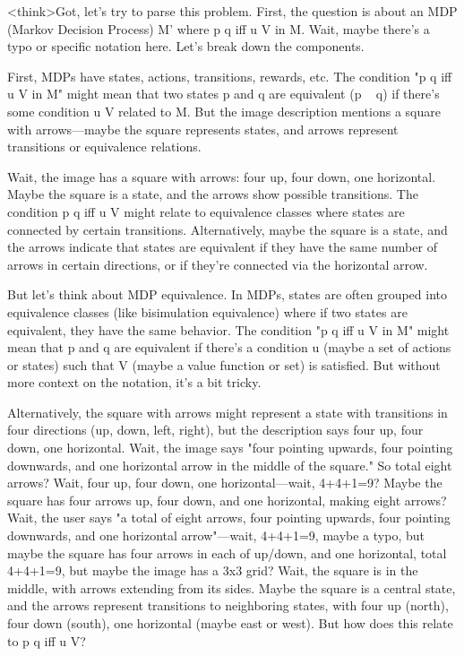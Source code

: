 <think>Got, let's try to parse this problem. First, the question is about an MDP (Markov Decision Process) M' where p q iff u V in M. Wait, maybe there's a typo or specific notation here. Let's break down the components.

First, MDPs have states, actions, transitions, rewards, etc. The condition "p q iff u V in M" might mean that two states p and q are equivalent (p ~ q) if there's some condition u V related to M. But the image description mentions a square with arrows—maybe the square represents states, and arrows represent transitions or equivalence relations.

Wait, the image has a square with arrows: four up, four down, one horizontal. Maybe the square is a state, and the arrows show possible transitions. The condition p q iff u V might relate to equivalence classes where states are connected by certain transitions. Alternatively, maybe the square is a state, and the arrows indicate that states are equivalent if they have the same number of arrows in certain directions, or if they're connected via the horizontal arrow.

But let's think about MDP equivalence. In MDPs, states are often grouped into equivalence classes (like bisimulation equivalence) where if two states are equivalent, they have the same behavior. The condition "p q iff u V in M" might mean that p and q are equivalent if there's a condition u (maybe a set of actions or states) such that V (maybe a value function or set) is satisfied. But without more context on the notation, it's a bit tricky.

Alternatively, the square with arrows might represent a state with transitions in four directions (up, down, left, right), but the description says four up, four down, one horizontal. Wait, the image says "four pointing upwards, four pointing downwards, and one horizontal arrow in the middle of the square." So total eight arrows? Wait, four up, four down, one horizontal—wait, 4+4+1=9? Maybe the square has four arrows up, four down, and one horizontal, making eight arrows? Wait, the user says "a total of eight arrows, four pointing upwards, four pointing downwards, and one horizontal arrow"—wait, 4+4+1=9, maybe a typo, but maybe the square has four arrows in each of up/down, and one horizontal, total 4+4+1=9, but maybe the image has a 3x3 grid? Wait, the square is in the middle, with arrows extending from its sides. Maybe the square is a central state, and the arrows represent transitions to neighboring states, with four up (north), four down (south), one horizontal (maybe east or west). But how does this relate to p q iff u V?

